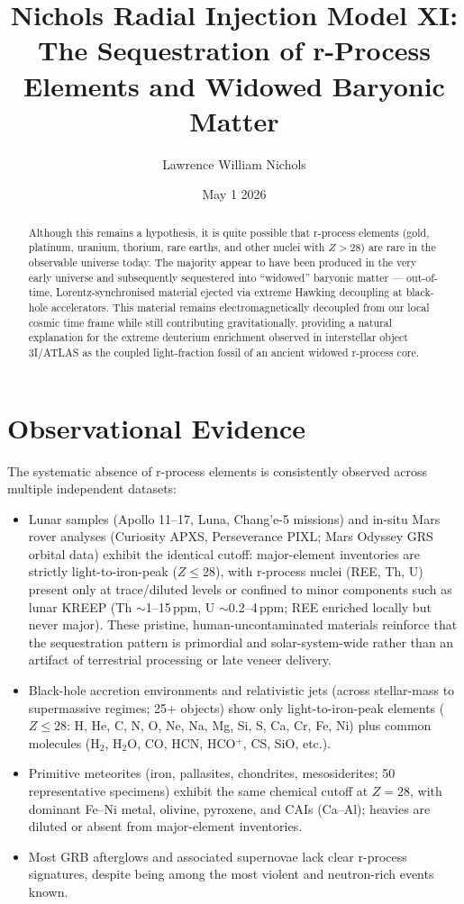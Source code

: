 \documentclass[12pt]{article}
\date{May 1 2026}
\title{Nichols Radial Injection Model XI: The Sequestration of r-Process Elements and Widowed Baryonic Matter}
\author{Lawrence William Nichols}
\begin{document}
\maketitle

\begin{abstract}
Although this remains a hypothesis, it is quite possible that r-process elements (gold, platinum, uranium, thorium, rare earths, and other nuclei with $Z > 28$) are rare in the observable universe today. The majority appear to have been produced in the very early universe and subsequently sequestered into ``widowed'' baryonic matter --- out-of-time, Lorentz-synchronised material ejected via extreme Hawking decoupling at black-hole accelerators. This material remains electromagnetically decoupled from our local cosmic time frame while still contributing gravitationally, providing a natural explanation for the extreme deuterium enrichment observed in interstellar object 3I/ATLAS as the coupled light-fraction fossil of an ancient widowed r-process core.
\end{abstract}

\section{Observational Evidence}

The systematic absence of r-process elements is consistently observed across multiple independent datasets:

\begin{itemize}
    \item Lunar samples (Apollo 11--17, Luna, Chang'e-5 missions) and in-situ Mars rover analyses (Curiosity APXS, Perseverance PIXL; Mars Odyssey GRS orbital data) exhibit the identical cutoff: major-element inventories are strictly light-to-iron-peak ($Z \leq 28$), with r-process nuclei (REE, Th, U) present only at trace/diluted levels or confined to minor components such as lunar KREEP (Th $\sim$1--15\,ppm, U $\sim$0.2--4\,ppm; REE enriched locally but never major). These pristine, human-uncontaminated materials reinforce that the sequestration pattern is primordial and solar-system-wide rather than an artifact of terrestrial processing or late veneer delivery.
    
    \item Black-hole accretion environments and relativistic jets (across stellar-mass to supermassive regimes; 25+ objects) show only light-to-iron-peak elements ($Z \leq 28$: H, He, C, N, O, Ne, Na, Mg, Si, S, Ca, Cr, Fe, Ni) plus common molecules (H$_2$, H$_2$O, CO, HCN, HCO$^+$, CS, SiO, etc.).
    
    \item Primitive meteorites (iron, pallasites, chondrites, mesosiderites; 50 representative specimens) exhibit the same chemical cutoff at $Z = 28$, with dominant Fe--Ni metal, olivine, pyroxene, and CAIs (Ca--Al); heavies are diluted or absent from major-element inventories.
    
    \item Most GRB afterglows and associated supernovae lack clear r-process signatures, despite being among the most violent and neutron-rich events known.
\end{itemize}
\end{document}
